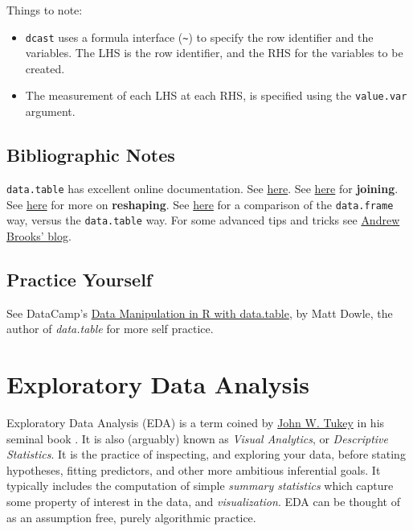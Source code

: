 \documentclass[]{book}
\providecommand{\tightlist}{%
  \setlength{\itemsep}{0pt}\setlength{\parskip}{0pt}}
\theoremstyle{definition}
\theoremstyle{definition}
\theoremstyle{definition}
\theoremstyle{remark}
\begin{document}
Things to note:

\begin{itemize}
\tightlist
\item
  \texttt{dcast} uses a formula interface (\texttt{\textasciitilde{}})
  to specify the row identifier and the variables. The LHS is the row
  identifier, and the RHS for the variables to be created.
\item
  The measurement of each LHS at each RHS, is specified using the
  \texttt{value.var} argument.
\end{itemize}

\section{Bibliographic Notes}\label{bibliographic-notes-2}

\texttt{data.table} has excellent online documentation. See
\href{https://cran.r-project.org/web/packages/data.table/vignettes/datatable-intro.html}{here}.
See
\href{https://rstudio-pubs-static.s3.amazonaws.com/52230_5ae0d25125b544caab32f75f0360e775.html}{here}
for \textbf{joining}. See
\href{https://cran.r-project.org/web/packages/data.table/vignettes/datatable-reshape.html}{here}
for more on \textbf{reshaping}. See
\href{https://www.r-bloggers.com/intro-to-the-data-table-package/}{here}
for a comparison of the \texttt{data.frame} way, versus the
\texttt{data.table} way. For some advanced tips and tricks see
\href{http://brooksandrew.github.io/simpleblog/articles/advanced-data-table/}{Andrew
Brooks' blog}.

\section{Practice Yourself}\label{practice-yourself-1}

See DataCamp's
\href{https://www.datacamp.com/courses/data-manipulation-in-r-with-datatable}{Data
Manipulation in R with data.table}, by Matt Dowle, the author of
\emph{data.table} for more self practice.

\chapter{Exploratory Data Analysis}\label{eda}

Exploratory Data Analysis (EDA) is a term coined by
\href{https://en.wikipedia.org/wiki/John_Tukey}{John W. Tukey} in his
seminal book \citep{tukey1977exploratory}. It is also (arguably) known
as \emph{Visual Analytics}, or \emph{Descriptive Statistics}. It is the
practice of inspecting, and exploring your data, before stating
hypotheses, fitting predictors, and other more ambitious inferential
goals. It typically includes the computation of simple \emph{summary
statistics} which capture some property of interest in the data, and
\emph{visualization}. EDA can be thought of as an assumption free,
purely algorithmic practice.
\end{document}
